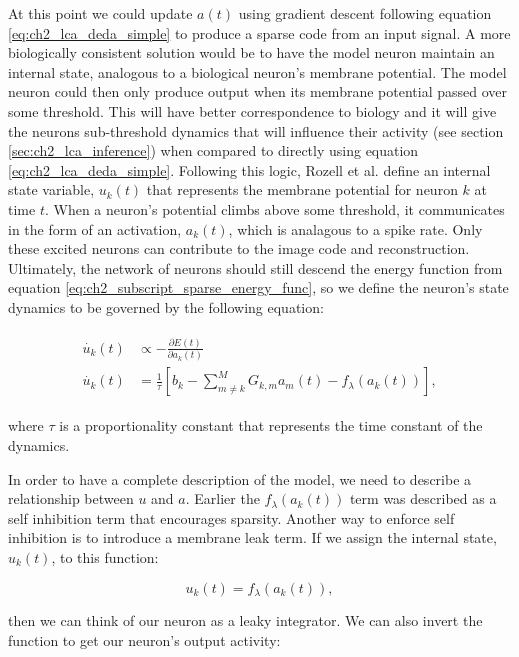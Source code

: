 At this point we could update $a(t)$ using gradient descent following equation \eqref{eq:ch2_lca_deda_simple} to produce a sparse code from an input signal. A more biologically consistent solution would be to have the model neuron maintain an internal state, analogous to a biological neuron's membrane potential. The model neuron could then only produce output when its membrane potential passed over some threshold. This will have better correspondence to biology and it will give the neurons sub-threshold dynamics that will influence their activity (see section \ref{sec:ch2_lca_inference}) when compared to directly using equation \ref{eq:ch2_lca_deda_simple}. Following this logic, Rozell et al. \citeyearpar{rozell2008sparse} define an internal state variable, $u_{k}(t)$ that represents the membrane potential for neuron $k$ at time $t$. When a neuron's potential climbs above some threshold, it communicates in the form of an activation, $a_{k}(t)$, which is analagous to a spike rate. Only these excited neurons can contribute to the image code and reconstruction. Ultimately, the network of neurons should still descend the energy function from equation \eqref{eq:ch2_subscript_sparse_energy_func}, so we define the neuron's state dynamics to be governed by the following equation:

\begin{align}\label{eq:ch2_u_dot}
\begin{split}
    \dot{u_{k}}(t) &\propto - \frac{\partial E(t)} {\partial a_{k}(t)} \\
    \dot{u_{k}}(t) &= \frac{1}{\tau} \left[b_{k} - \sum_{m \neq k}^{M}G_{k,m}a_{m}(t) - f_{\lambda}(a_{k}(t)) \right],
\end{split}
\end{align}

\noindent where $\tau$ is a proportionality constant that represents the time constant of the dynamics.

In order to have a complete description of the model, we need to describe a relationship between $u$ and $a$. Earlier the $f_{\lambda}(a_{k}(t))$ term was described as a self inhibition term that encourages sparsity. Another way to enforce self inhibition is to introduce a membrane leak term. If we assign the internal state, $u_{k}(t)$, to this function:

\begin{equation}\label{eq:ch2_u_func_a}
    u_k(t) = f_{\lambda}(a_{k}(t)),
\end{equation}

\noindent then we can think of our neuron as a leaky integrator. We can also invert the function to get our neuron's output activity:

